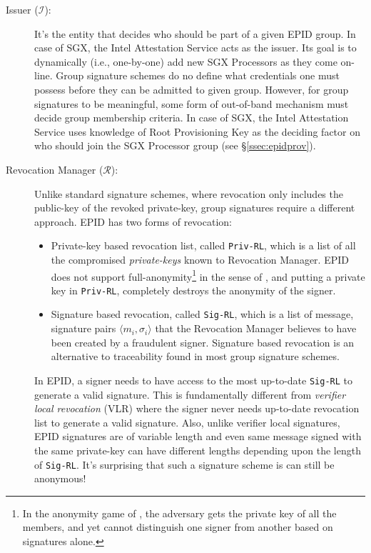 \documentclass[letterpaper]{article}
\newcommand{\secref}[1]{\S\ref{#1}}
\begin{document}
  \begin{description}
  \item [Issuer ($\mathcal{I}$):] It's the entity that decides who
    should be part of a given EPID group. In case of SGX, the Intel
    Attestation Service acts as the issuer. Its goal is to dynamically
    (i.e., one-by-one) add new SGX Processors as they come
    on-line. Group signature schemes do no define what credentials one
    must possess before they can be admitted to given group. However,
    for group signatures to be meaningful, some form of out-of-band
    mechanism must decide group membership criteria. In case of SGX,
    the Intel Attestation Service uses knowledge of Root Provisioning
    Key as the deciding factor on who should join the SGX Processor
    group (see \secref{ssec:epidprov}).

  \item[Revocation Manager ($\mathcal{R}$):] Unlike standard signature
    schemes, where revocation only includes the public-key of the
    revoked private-key, group signatures require a different
    approach. EPID has two forms of revocation:

    \begin{itemize}
    \item Private-key based revocation list, called \texttt{Priv-RL},
      which is a list of all the compromised \textit{private-keys}
      known to Revocation Manager. EPID does not support
      full-anonymity\footnote{In the \textsf{anonymity} game of
        \cite{BMW03}, the adversary gets the private key of all the
        members, and yet cannot distinguish one signer from another
        based on signatures alone.} in the sense of \cite{BMW03}, and
      putting a private key in \texttt{Priv-RL}, completely destroys
      the anonymity of the signer.
      \item Signature based revocation, called \texttt{Sig-RL}, which
        is a list of message, signature pairs $\langle m_i, \sigma_i
        \rangle$ that the Revocation Manager believes to have been
        created by a fraudulent signer. Signature based revocation is
        an alternative to traceability found in most group signature
        schemes.
    \end{itemize}

    In EPID, a signer needs to have access to the most up-to-date
    \texttt{Sig-RL} to generate a valid signature. This is
    fundamentally different from \textit{verifier local revocation}
    (VLR) \cite{BonehVLR} where the signer never needs up-to-date
    revocation list to generate a valid signature. Also, unlike
    verifier local signatures, EPID signatures are of variable length
    and even same message signed with the same private-key can have
    different lengths depending upon the length of
    \texttt{Sig-RL}. It's surprising that such a signature scheme is
    can still be anonymous!


\end{description}
\end{document}
